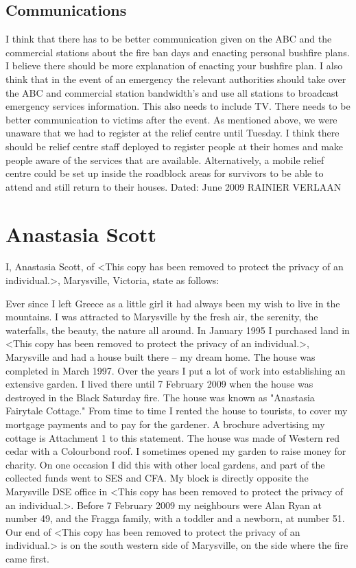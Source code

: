 \documentclass[a4paper]{article}
\begin{document}
    \subsection{Communications}

        I think that there has to be better communication given on the ABC and the commercial stations about the fire ban days and enacting personal bushfire plans. I believe there should be more explanation of enacting your bushfire plan.
        I also think that in the event of an emergency the relevant authorities should take over the ABC and commercial station bandwidth's and use all stations to broadcast emergency services information. This also needs to include TV.
        There needs to be better communication to victims after the event. As mentioned above, we were unaware that we had to register at the relief centre until Tuesday. I think there should be relief centre staff deployed to register people at their homes and make people aware of the services that are available. Alternatively, a mobile relief centre could be set up inside the roadblock areas for survivors to be able to attend and still return to their houses.
    \newline
    \newline
    Dated: June 2009
    \newline
    \newline
    RAINIER VERLAAN

\section{Anastasia Scott}

    I, Anastasia Scott, of <This copy has been removed to protect the privacy of an individual.>, Marysville, Victoria, state as follows:

    Ever since I left Greece as a little girl it had always been my wish to live in the mountains. I was attracted to Marysville by the fresh air, the serenity, the waterfalls, the beauty, the nature all around.
    In January 1995 I purchased land in <This copy has been removed to protect the privacy of an individual.>, Marysville and had a house built there – my dream home. The house was completed in March 1997. Over the years I put a lot of work into establishing an extensive garden. I lived there until 7 February 2009 when the house was destroyed in the Black Saturday fire.
    The house was known as "Anastasia Fairytale Cottage." From time to time I rented the house to tourists, to cover my mortgage payments and to pay for the gardener. A brochure advertising my cottage is Attachment 1 to this statement. The house was made of Western red cedar with a Colourbond roof.
    I sometimes opened my garden to raise money for charity. On one occasion I did this with other local gardens, and part of the collected funds went to SES and CFA.
    My block is directly opposite the Marysville DSE office in <This copy has been removed to protect the privacy of an individual.>. Before 7 February 2009 my neighbours were Alan Ryan at number 49, and the Fragga family, with a toddler and a newborn, at number 51. Our end of <This copy has been removed to protect the privacy of an individual.> is on the south western side of Marysville, on the side where the fire came first.
\end{document}
